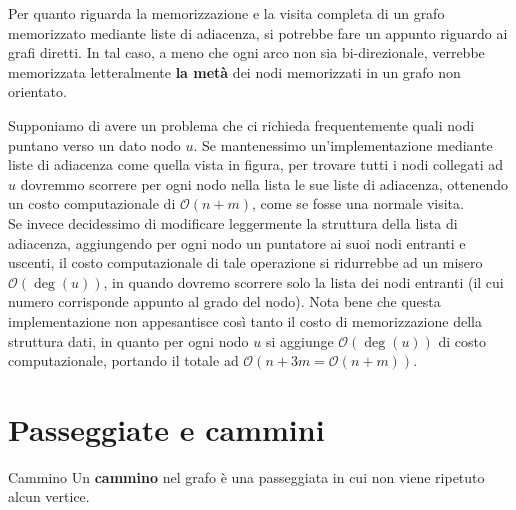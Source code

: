 \documentclass[12pt]{report}
\begin{document}
	Per quanto riguarda la memorizzazione e la visita completa di un grafo memorizzato mediante liste di adiacenza, si potrebbe fare un appunto riguardo ai grafi diretti. In tal caso, a meno che ogni arco non sia bi-direzionale, verrebbe memorizzata letteralmente \textbf{la metà} dei nodi memorizzati in un grafo non orientato.
	\begin{osservazione}{}{}
		Supponiamo di avere un problema che ci richieda frequentemente quali nodi puntano verso un dato nodo $u$.
		Se mantenessimo un'implementazione mediante liste di adiacenza come quella vista in figura, per trovare tutti i nodi collegati ad $u$ dovremmo scorrere per ogni nodo nella lista le sue liste di adiacenza, ottenendo un costo computazionale di $\mathcal{O}(n + m)$, come se fosse una normale visita.\\
		\smallbreak
		Se invece decidessimo di modificare leggermente la struttura della lista di adiacenza, aggiungendo per ogni nodo un puntatore ai suoi nodi entranti e uscenti, il costo computazionale di tale operazione si ridurrebbe ad un misero $\mathcal{O}(\operatorname{deg}(u))$, in quando dovremo scorrere solo la lista dei nodi entranti (il cui numero corrisponde appunto al grado del nodo).
		Nota bene che questa implementazione non appesantisce così tanto il costo di memorizzazione della struttura dati, in quanto per ogni nodo $u$ si aggiunge $\mathcal{O}(\operatorname{deg}(u))$ di costo computazionale, portando il totale ad $\mathcal{O}(n+3m = \mathcal{O}(n+m))$.
	\end{osservazione}
	
	\section{Passeggiate e cammini}
	
	\begin{definizione}{Cammino}{}
		Un \textbf{cammino} nel grafo è una passeggiata in cui non viene ripetuto alcun vertice.
	\end{definizione}
	
\end{document}

